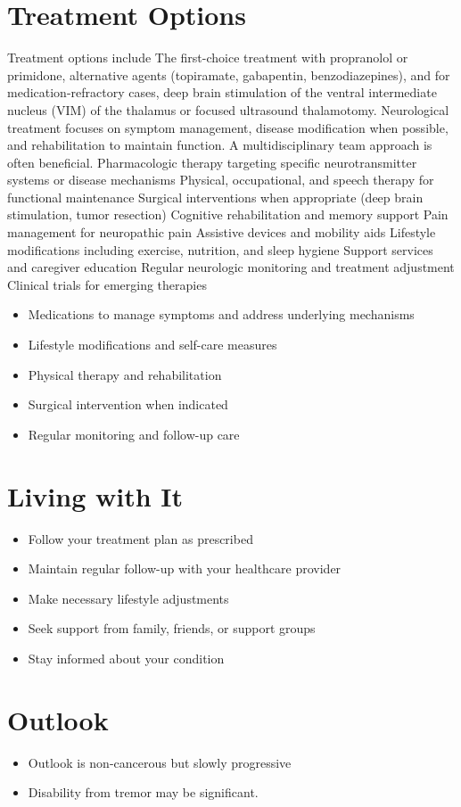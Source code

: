 \section{Treatment Options}
Treatment options include The first-choice treatment with propranolol or primidone, alternative agents (topiramate, gabapentin, benzodiazepines), and for medication-refractory cases, deep brain stimulation of the ventral intermediate nucleus (VIM) of the thalamus or focused ultrasound thalamotomy. Neurological treatment focuses on symptom management, disease modification when possible, and rehabilitation to maintain function. A multidisciplinary team approach is often beneficial. Pharmacologic therapy targeting specific neurotransmitter systems or disease mechanisms Physical, occupational, and speech therapy for functional maintenance Surgical interventions when appropriate (deep brain stimulation, tumor resection) Cognitive rehabilitation and memory support Pain management for neuropathic pain Assistive devices and mobility aids Lifestyle modifications including exercise, nutrition, and sleep hygiene Support services and caregiver education Regular neurologic monitoring and treatment adjustment Clinical trials for emerging therapies

\begin{itemize}[noitemsep]
  \item Medications to manage symptoms and address underlying mechanisms
  \item Lifestyle modifications and self-care measures
  \item Physical therapy and rehabilitation
  \item Surgical intervention when indicated
  \item Regular monitoring and follow-up care
\end{itemize}
\section{Living with It}
\begin{itemize}[noitemsep]
  \item Follow your treatment plan as prescribed
  \item Maintain regular follow-up with your healthcare provider
  \item Make necessary lifestyle adjustments
  \item Seek support from family, friends, or support groups
  \item Stay informed about your condition
\end{itemize}
\section{Outlook}
\begin{itemize}[noitemsep]
  \item Outlook is non-cancerous but slowly progressive
  \item Disability from tremor may be significant.
\end{itemize}
